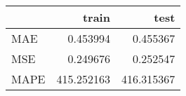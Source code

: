 \begin{tabular}{lrr}
\toprule
{} &       train &        test \\
\midrule
MAE  &    0.453994 &    0.455367 \\
MSE  &    0.249676 &    0.252547 \\
MAPE &  415.252163 &  416.315367 \\
\bottomrule
\end{tabular}
